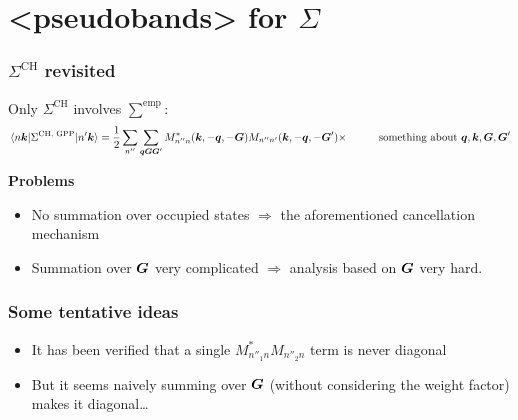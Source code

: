\documentclass[t]{beamer}
\newcommand{\xmark}{\ding{55}}%
\newcommand{\shortcode}[1]{\texttt{#1}}
\def\\{}%
\def\texttt#1{<#1>}%
\begin{document}
\section{\shortcode{pseudobands} for $\Sigma$}

\begin{frame}
\frametitle{$\Sigma^{\text{CH}}$ revisited}

Only $\Sigma^{\text{CH}}$ involves $\sum^{\text{emp}}$:
\begin{equation}
    \begin{aligned}
        \mel*{n \vb*{k}}{\Sigma^{\text{CH, GPP}}}{n' \vb*{k}} 
        &= \frac{1}{2} \sum_{n''} \sum_{\vb*{q} \vb*{G} \vb*{G}'} M_{n'' n}^*(\vb*{k}, - \vb*{q}, -\vb*{G})
        M_{n'' n'}(\vb*{k}, - \vb*{q}, - \vb*{G}') \times  \\
        &\quad \quad \text{something about $\vb*{q}, \vb*{k}, \vb*{G}, \vb*{G}'$}
    \end{aligned}
    \label{eq:ch.simple}
\end{equation}

\textbf{Problems} \begin{itemize}
    \item No summation over occupied states $\Rightarrow$ 
    \xmark the aforementioned cancellation mechanism 
    \item Summation over $\vb*{G}$ very complicated $\Rightarrow$
    analysis based on $\vb*{G}$ very hard.
\end{itemize}

\end{frame}

\begin{frame}
\frametitle{Some tentative ideas}

\begin{itemize}
    \item It has been verified that a single $M_{n''_1 n}^* M_{n''_2 n}$ term is never diagonal
    \item But it seems naively summing over $\vb*{G}$ (without considering the weight factor)
    makes it diagonal\dots
\end{itemize}    



\end{frame}
\end{document}

